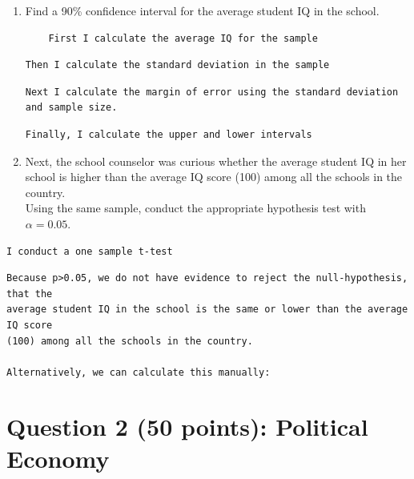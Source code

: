 \documentclass[12pt,letterpaper]{article}
\begin{document}
	\begin{enumerate}
		\item Find a 90\% confidence interval for the average student IQ in the school.\\

\begin{verbatim}
	First I calculate the average IQ for the sample
\end{verbatim}
  
\begin{verbatim}
Then I calculate the standard deviation in the sample
\end{verbatim}		
  
\begin{verbatim}
Next I calculate the margin of error using the standard deviation and sample size.
\end{verbatim}	
  
\begin{verbatim}
Finally, I calculate the upper and lower intervals
\end{verbatim}	
  


		\item Next, the school counselor was curious  whether  the average student IQ in her school is higher than the average IQ score (100) among all the schools in the country.\\ 
		


		\noindent Using the same sample, conduct the appropriate hypothesis test with $\alpha=0.05$.
	\end{enumerate}

\begin{verbatim}
I conduct a one sample t-test
\end{verbatim}
  
\begin{verbatim}
Because p>0.05, we do not have evidence to reject the null-hypothesis, that the
average student IQ in the school is the same or lower than the average IQ score
(100) among all the schools in the country.

Alternatively, we can calculate this manually:
\end{verbatim}


	\newpage
	
	\section*{Question 2 (50 points): Political Economy}
	
\end{document}
